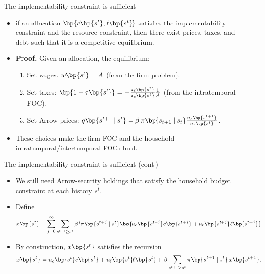 \documentclass[11pt,xcolor={dvipsnames},aspectratio=159,hyperref={pdftex,pdfpagemode=UseNone,hidelinks,pdfdisplaydoctitle=true},usepdftitle=false]{beamer}
\begin{document}
            \begin{frame}{The implementability constraint is sufficient}
                \begin{itemize}
                \item {} if an  allocation $\bp{c\bp{s^t}, \ell\bp{s^t}}$ satisfies the implementability constraint and the resource constraint, then there exist prices, taxes, and debt such that it is a competitive equilibrium.
                \item \textbf{Proof.} Given an allocation,  the equilibrium:
                \begin{enumerate}
                    \item Set wages: $w\bp{s^t} = A$ (from the firm problem).
                    \item Set taxes: $\bp{1-\tau\bp{s^t}} = -\frac{u_\ell\bp{s^t}}{u_c\bp{s^t}} \frac{1}{A}$ (from the intratemporal FOC).
                    \item Set Arrow prices: $q\bp{s^{t+1} \mid s^t} = \beta\,\pi\bp{s_{t+1}\mid s_t}\frac{u_c\bp{s^{t+1}}}{u_c\bp{s^t}}$.
                \end{enumerate}
                \item These choices make the firm FOC and the household intratemporal/intertemporal FOCs hold.
                \end{itemize}
            \end{frame}

            \begin{frame}{The implementability constraint is sufficient (cont.)}
                \begin{itemize}
                \item We still need Arrow-security holdings that satisfy the  household budget constraint at each history $s^t$.
                \item Define
                \begin{align*}
                    x\bp{s^t} \equiv \sum_{j=0}^\infty \sum_{s^{t+j} \geq s^{t}} \beta^j \pi\bp{s^{t+j}\mid s^{t}} \bs{u_c\bp{s^{t+j}} c\bp{s^{t+j}} + u_\ell\bp{s^{t+j}} \ell\bp{s^{t+j}}}
                \end{align*}
                \item By construction, $x\bp{s^t}$ satisfies the recursion
                \begin{align*}
                    x\bp{s^t} = u_c\bp{s^t} c\bp{s^t} + u_\ell\bp{s^t} \ell\bp{s^t}
                    + \beta \sum_{s^{t+1}\ge s^t} \pi\bp{s^{t+1}\mid s^t}\, x\bp{s^{t+1}}.
                \end{align*}
                \end{itemize}
            \end{frame}
\end{document}
